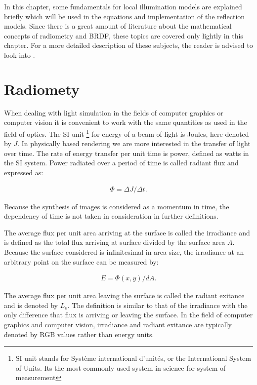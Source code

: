 \hypertarget{Fundamentals}{
}

In this chapter, some fundamentals for local illumination models are explained briefly which will be used in the equations and implementation of the reflection models. Since there is a great amount of literature about the mathematical concepts of radiometry and BRDF, these topics are covered only lightly in this chapter. For a more detailed description of these subjects, the reader is advised to look into \cite{RTR} \cite{GlobalIllumination} \cite{DigitalModeling}.

\section{Radiomety}\label{sec:Radiometry}

When dealing with light simulation in the fields of computer graphics or computer vision it is convenient to work with the same quantities as used in the field of optics. The SI unit \footnote[1]{SI unit stands for Système international d'unités, or the International System of Units. Its the most commonly used system in science for system of measurement} for energy of a beam of light is Joules, here denoted by $J$. In physically based rendering we are more interested in the transfer of light over time. The rate of energy transfer per unit time is power, defined as watts in the SI system. Power radiated over a period of time is called radiant flux and expressed as: 

		\begin{eqnarray*}
			\Phi = \Delta J / \Delta t. 
		\end{eqnarray*}

Because the synthesis of images is considered as a momentum in time, the dependency of time is not taken in consideration in further definitions.

The average flux per unit area arriving at the surface is called the irradiance and is defined as the total flux arriving at surface divided by the surface area $A$. Because the surface considered is infinitesimal in area size, the irradiance at an arbitrary point on the surface can be measured by:

		\begin{eqnarray*}
			E = \Phi(x,y) / dA. 
		\end{eqnarray*}

The average flux per unit area leaving the surface is called the radiant exitance and is denoted by $L_o$. The definition is similar to that of the irradiance with the only difference that flux is arriving or leaving the surface. In the field of computer graphics and computer vision, irradiance and radiant exitance are typically denoted by RGB values rather than energy units.

